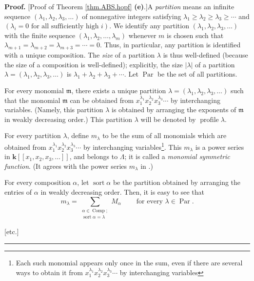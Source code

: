\documentclass
[numbers=enddot,12pt,final,onecolumn,notitlepage,abstracton]{scrartcl}%
\theoremstyle{definition}
\newenvironment{proof}[1][Proof]{\noindent\textbf{#1.} }{\ \rule{0.5em}{0.5em}}
\newenvironment{noncompile}{}{}
\let\sumnonlimits\sum
\renewcommand{\sum}{\sumnonlimits\limits}
\begin{document}
\begin{noncompile}
\begin{proof}
[Proof of Theorem \ref{thm.ABS.hopf} \textbf{(e)}.]A \textit{partition} means
an infinite sequence $\left(  \lambda_{1},\lambda_{2},\lambda_{3}%
,\ldots\right)  $ of nonnegative integers satisfying $\lambda_{1}\geq
\lambda_{2}\geq\lambda_{3}\geq\cdots$ and $\left(  \lambda_{i}=0\text{ for all
sufficiently high }i\right)  $. We identify any partition $\left(  \lambda
_{1},\lambda_{2},\lambda_{3},\ldots\right)  $ with the finite sequence
$\left(  \lambda_{1},\lambda_{2},\ldots,\lambda_{m}\right)  $ whenever $m$ is
chosen such that $\lambda_{m+1}=\lambda_{m+2}=\lambda_{m+3}=\cdots=0$. Thus,
in particular, any partition is identified with a unique composition. The
\textit{size} of a partition $\lambda$ is thus well-defined (because the size
of a composition is well-defined); explicitly, the size $\left\vert
\lambda\right\vert $ of a partition $\lambda=\left(  \lambda_{1},\lambda
_{2},\lambda_{3},\ldots\right)  $ is $\lambda_{1}+\lambda_{2}+\lambda
_{3}+\cdots$. Let $\operatorname*{Par}$ be the set of all partitions.

For every monomial $\mathfrak{m}$, there exists a unique partition
$\lambda=\left(  \lambda_{1},\lambda_{2},\lambda_{3},\ldots\right)  $ such
that the monomial $\mathfrak{m}$ can be obtained from $x_{1}^{\lambda_{1}%
}x_{2}^{\lambda_{2}}x_{3}^{\lambda_{3}}\cdots$ by interchanging variables.
(Namely, this partition $\lambda$ is obtained by arranging the exponents of
$\mathfrak{m}$ in weakly decreasing order.) This partition $\lambda$ will be
denoted by $\operatorname*{profile}\lambda$.

For every partition $\lambda$, define $m_{\lambda}$ to be the sum of all
monomials which are obtained from $x_{1}^{\lambda_{1}}x_{2}^{\lambda_{2}}%
x_{3}^{\lambda_{3}}\cdots$ by interchanging variables\footnote{Each such
monomial appears only once in the sum, even if there are several ways to
obtain it from $x_{1}^{\lambda_{1}}x_{2}^{\lambda_{2}}x_{3}^{\lambda_{3}%
}\cdots$ by interchanging variables}. This $m_{\lambda}$ is a power series in
$\mathbf{k}\left[  \left[  x_{1},x_{2},x_{3},\ldots\right]  \right]  $, and
belongs to $\Lambda$; it is called a \textit{monomial symmetric function}. (It
agrees with the power series $m_{\lambda}$ in \cite[(2.1.1)]{Reiner}.)

For every composition $\alpha$, let $\operatorname*{sort}\alpha$ be the
partition obtained by arranging the entries of $\alpha$ in weakly decreasing
order. Then, it is easy to see that%
\begin{equation}
m_{\lambda}=\sum_{\substack{\alpha\in\operatorname*{Comp}%
;\\\operatorname*{sort}\alpha=\lambda}}M_{\alpha}\ \ \ \ \ \ \ \ \ \ \text{for
every }\lambda\in\operatorname*{Par}. \label{pf.thm.ABS.hopf.1}%
\end{equation}


[etc.]
\end{proof}
\end{noncompile}
\end{document}
